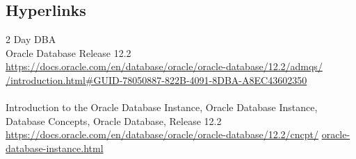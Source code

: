 
\subsection{Hyperlinks}

2 Day DBA\\
Oracle Database Release 12.2\\
\href{https://docs.oracle.com/en/database/oracle/oracle-database/12.2/admqs/introduction.html#GUID-78050887-822B-4091-8DBA-A8EC43602350}{https://docs.oracle.com/en/database/oracle/oracle-database/12.2/admqs/}\\
\href{https://docs.oracle.com/en/database/oracle/oracle-database/12.2/admqs/introduction.html#GUID-78050887-822B-4091-8DBA-A8EC43602350}{/introduction.html\#GUID-78050887-822B-4091-8DBA-A8EC43602350}\\
\\
Introduction to the Oracle Database Instance, 
Oracle Database Instance,\\
Database Concepts, 
Oracle Database, Release 12.2\\
\href{https://docs.oracle.com/en/database/oracle/oracle-database/12.2/cncpt/oracle-database-instance.html}{https://docs.oracle.com/en/database/oracle/oracle-database/12.2/cncpt/}\newline
\href{http://www.google.com}{oracle-database-instance.html}\\
\\
